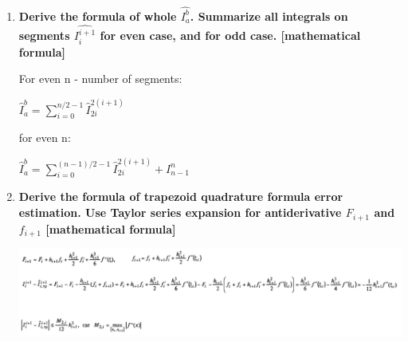 \documentclass{article}
\begin{document}
\begin{enumerate}
    
    \item \textbf{Derive the formula of whole $\hat{I_{a}^{b}}$. Summarize all integrals on segments $\hat{I_{i}^{i+1}}$ for even case, and for odd case. [mathematical formula]}
    
    For even n - number of segments:
    
    $\hat{I}^{b}_{a} = \sum_{i=0}^{n/2-1} \hat{I}^{2(i+1)}_{2i}$
    
    for even n:
    
    $\hat{I}^{b}_{a} = \sum_{i=0}^{(n-1)/2-1} \hat{I}^{2(i+1)}_{2i} + I^n_{n-1}$
    
    \item \textbf{Derive the formula of trapezoid quadrature formula error estimation. Use Taylor series expansion for antiderivative $F_{i+1}$ and $f_{i+1}$ [mathematical formula]}
    
    
    \includegraphics[scale=0.25]{q4answer.png}
\end{enumerate}
\end{document}
